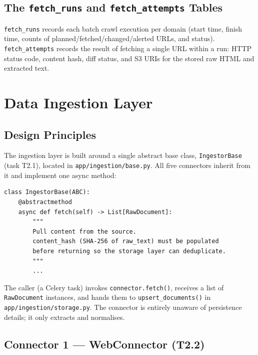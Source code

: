 \documentclass[12pt,a4paper]{article}
\begin{document}
\subsection{The \texttt{fetch\_runs} and \texttt{fetch\_attempts} Tables}

\texttt{fetch\_runs} records each batch crawl execution per domain (start time, finish time, counts of planned/fetched/changed/alerted URLs, and status). \texttt{fetch\_attempts} records the result of fetching a single URL within a run: HTTP status code, content hash, diff status, and S3 URIs for the stored raw HTML and extracted text.

\section{Data Ingestion Layer}

\subsection{Design Principles}

The ingestion layer is built around a single abstract base class, \texttt{IngestorBase} (task T2.1), located in \linebreak\texttt{app/ingestion/base.py}. All five connectors inherit from it and implement one async method:

\begin{lstlisting}[caption={IngestorBase interface}]
class IngestorBase(ABC):
    @abstractmethod
    async def fetch(self) -> List[RawDocument]:
        """
        Pull content from the source.
        content_hash (SHA-256 of raw_text) must be populated
        before returning so the storage layer can deduplicate.
        """
        ...
\end{lstlisting}

The caller (a Celery task) invokes \texttt{connector.fetch()}, receives a list of \texttt{RawDocument} instances, and hands them to \texttt{upsert\_documents()} in \texttt{app/ingestion/storage.py}. The connector is entirely unaware of persistence details; it only extracts and normalises.

\subsection{Connector 1 — WebConnector (T2.2)}
\end{document}
